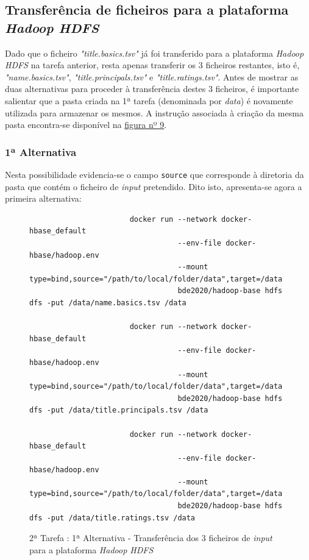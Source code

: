 \documentclass[a4paper]{report}
\begin{document}
{		\subsection{Transferência de ficheiros para a plataforma \textit{Hadoop HDFS}} \label{subsec:Task2-2}
		Dado que o ficheiro \textit{"title.basics.tsv"} já foi transferido para a plataforma \textit{Hadoop HDFS} na tarefa anterior, resta apenas transferir os 3 ficheiros restantes, isto é, \textit{"name.basics.tsv"}, \textit{"title.principals.tsv"} e \textit{"title.ratings.tsv"}.
		Antes de mostrar as duas alternativas para proceder à transferência destes 3 ficheiros, é importante salientar que a pasta criada na 1ª tarefa (denominada por \textit{data}) é novamente utilizada para armazenar os mesmos. A instrução associada à criação da mesma pasta encontra-se disponível na \hyperref[fig:9]{figura nº 9}.

			\subsubsection{1ª Alternativa}
			Nesta possibilidade evidencia-se o campo \texttt{source} que corresponde à diretoria da pasta que contém o ficheiro de \textit{input} pretendido.
			Dito isto, apresenta-se agora a primeira alternativa:
			\begin{figure}[H]
				{
					\color{teal}
					\begin{verbatim}
					   docker run --network docker-hbase_default
					              --env-file docker-hbase/hadoop.env
					              --mount type=bind,source="/path/to/local/folder/data",target=/data
					              bde2020/hadoop-base hdfs dfs -put /data/name.basics.tsv /data
								  
					   docker run --network docker-hbase_default
					              --env-file docker-hbase/hadoop.env
					              --mount type=bind,source="/path/to/local/folder/data",target=/data
					              bde2020/hadoop-base hdfs dfs -put /data/title.principals.tsv /data
								  
					   docker run --network docker-hbase_default
					              --env-file docker-hbase/hadoop.env
					              --mount type=bind,source="/path/to/local/folder/data",target=/data
					              bde2020/hadoop-base hdfs dfs -put /data/title.ratings.tsv /data
					\end{verbatim}
				}
				\caption{2ª Tarefa : 1ª Alternativa - Transferência dos 3 ficheiros de \textit{input} para a plataforma \textit{Hadoop HDFS}}
				\label{fig:16}
			\end{figure}

}
\end{document}
